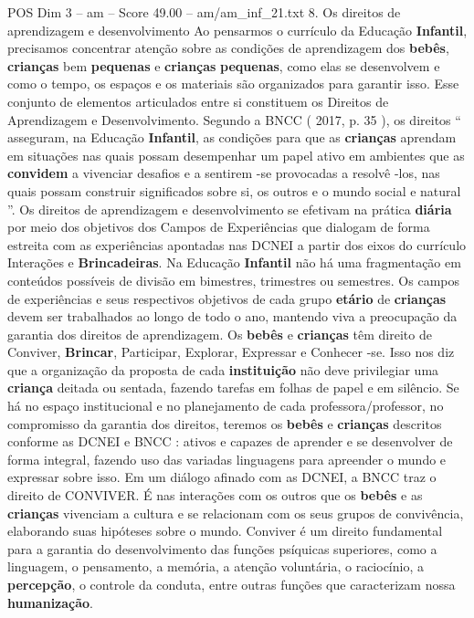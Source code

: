 \begin{textsample}{POS Dim 3 – am – Score 49.00 – am/am\_inf\_21.txt}  \label{ex:f3_pos_031}
8.
Os direitos de aprendizagem e desenvolvimento Ao pensarmos o currículo da Educação \textbf{Infantil}, precisamos concentrar atenção sobre as condições de aprendizagem dos \textbf{bebês}, \textbf{crianças} bem \textbf{pequenas} e \textbf{crianças} \textbf{pequenas}, como elas se desenvolvem e como o tempo, os espaços e os materiais são organizados para garantir isso.
Esse conjunto de elementos articulados entre si constituem os Direitos de Aprendizagem e Desenvolvimento.
Segundo a BNCC ( 2017, p. 35 ), os direitos “ asseguram, na Educação \textbf{Infantil}, as condições para que as \textbf{crianças} aprendam em situações nas quais possam desempenhar um papel ativo em ambientes que as \textbf{convidem} a vivenciar desafios e a sentirem -se provocadas a resolvê -los, nas quais possam construir significados sobre si, os outros e o mundo social e natural ”.
Os direitos de aprendizagem e desenvolvimento se efetivam na prática \textbf{diária} por meio dos objetivos dos Campos de Experiências que dialogam de forma estreita com as experiências apontadas nas DCNEI a partir dos eixos do currículo Interações e \textbf{Brincadeiras}.
Na Educação \textbf{Infantil} não há uma fragmentação em conteúdos possíveis de divisão em bimestres, trimestres ou semestres.
Os campos de experiências e seus respectivos objetivos de cada grupo \textbf{etário} de \textbf{crianças} devem ser trabalhados ao longo de todo o ano, mantendo viva a preocupação da garantia dos direitos de aprendizagem.
Os \textbf{bebês} e \textbf{crianças} têm direito de Conviver, \textbf{Brincar}, Participar, Explorar, Expressar e Conhecer -se.
Isso nos diz que a organização da proposta de cada \textbf{instituição} não deve privilegiar uma \textbf{criança} deitada ou sentada, fazendo tarefas em folhas de papel e em silêncio.
Se há no espaço institucional e no planejamento de cada professora/professor, no compromisso da garantia dos direitos, teremos os \textbf{bebês} e \textbf{crianças} descritos conforme as DCNEI e BNCC : ativos e capazes de aprender e se desenvolver de forma integral, fazendo uso das variadas linguagens para apreender o mundo e expressar sobre isso.
Em um diálogo afinado com as DCNEI, a BNCC traz o direito de CONVIVER.
É nas interações com os outros que os \textbf{bebês} e as \textbf{crianças} vivenciam a cultura e se relacionam com os seus grupos de convivência, elaborando suas hipóteses sobre o mundo.
Conviver é um direito fundamental para a garantia do desenvolvimento das funções psíquicas superiores, como a linguagem, o pensamento, a memória, a atenção voluntária, o raciocínio, a \textbf{percepção}, o controle da conduta, entre outras funções que caracterizam nossa \textbf{humanização}.

\end{textsample}
